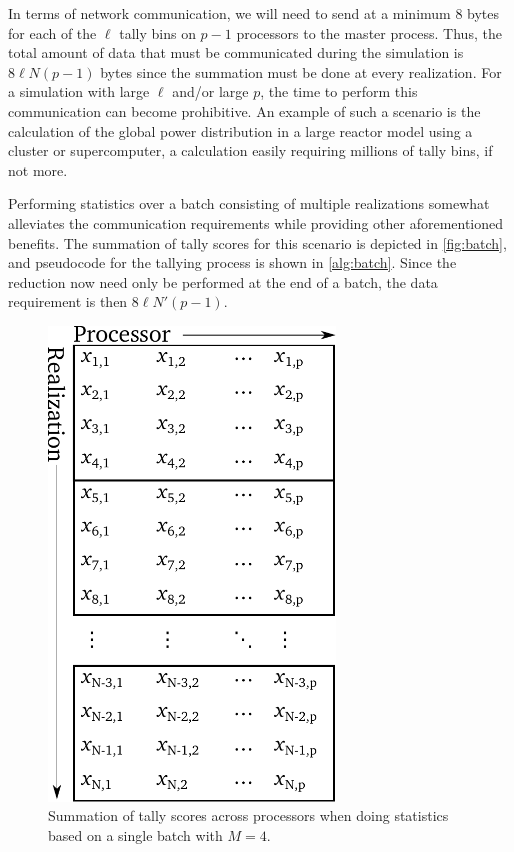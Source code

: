In terms of network communication, we will need to send at a minimum 8 bytes for
each of the $\ell$ tally bins on $p-1$ processors to the master process. Thus,
the total amount of data that must be communicated during the simulation is
$8\ell N (p-1)$ bytes since the summation must be done at every realization. For
a simulation with large $\ell$ and/or large $p$, the time to perform this
communication can become prohibitive. An example of such a scenario is the
calculation of the global power distribution in a large reactor model using a
cluster or supercomputer, a calculation easily requiring millions of tally bins,
if not more.

Performing statistics over a batch consisting of multiple realizations somewhat
alleviates the communication requirements while providing other aforementioned
benefits. The summation of tally scores for this scenario is depicted in
\autoref{fig:batch}, and pseudocode for the tallying process is shown in
\autoref{alg:batch}. Since the reduction now need only be performed at the end
of a batch, the data requirement is then $8\ell N' (p-1)$.
\begin{figure}[htb]
  \centering
  \includegraphics[width=3in]{figures/ch4/batch.pdf}
  \caption{Summation of tally scores across processors when doing statistics
    based on a single batch with $M=4$.}
  \label{fig:batch}
\end{figure}
